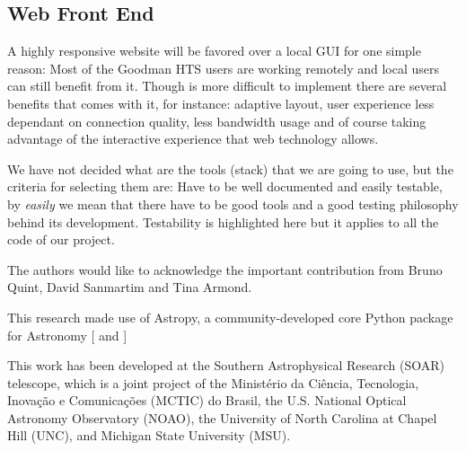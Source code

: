 \documentclass[11pt,twoside]{article}
\begin{document}
\subsection{Web Front End}
A highly responsive website will be favored over a local GUI for one simple reason: Most of the Goodman HTS users are working remotely and local users can still benefit from it. Though is more difficult to implement there are several benefits that comes with it, for instance: adaptive layout, user experience less dependant on connection quality, less bandwidth usage and of course taking advantage of the interactive experience that web technology allows.

We have not decided what are the tools (stack) that we are going to use, but the criteria for selecting them are: Have to be well documented and easily testable, by \emph{easily} we mean that there have to be good tools and a good testing philosophy behind its development. Testability is highlighted here but it applies to all the code of our project.


\acknowledgements

The authors would like to acknowledge the important contribution from Bruno Quint, David Sanmartim and Tina Armond.

This research made use of Astropy, a community-developed core Python package for Astronomy [\citet{2013A&A...558A..33A} and \citet{2018AJ....156..123A}] 

This work has been developed at the Southern Astrophysical Research (SOAR) telescope, which is a joint project of the Minist\'erio da Ci\^encia, Tecnologia, Inova\c{c}\~ao e Comunica\c{c}\~oes (MCTIC) do Brasil, the U.S. National Optical Astronomy Observatory (NOAO), the University of North Carolina at Chapel Hill (UNC), and Michigan State University (MSU). 


\end{document}
